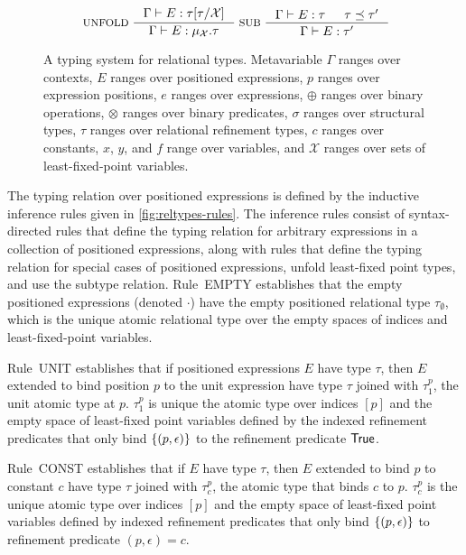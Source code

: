 \begin{figure}
\begin{gather*}
    \inference[ UNFOLD ]{
      \Gamma \judges E : %
      \replace{ \tau }{ \mathcal{X} }{ \tau } }{ 
      \Gamma \judges E : \mu_{\mathcal{X}}. \tau } 
    \inference[ SUB ]{
      \Gamma \judges E : \tau &
      \tau \subtype \tau' }{ %
      \Gamma \judges E : \tau' }
  \end{gather*}
  \caption{A typing system for relational types.
    Metavariable %
    $\Gamma$ ranges over contexts, %
    $E$ ranges over positioned expressions, %
    $p$ ranges over expression positions, %
    $e$ ranges over expressions, %
    $\oplus$ ranges over binary operations, %
    $\otimes$ ranges over binary predicates, %
    $\sigma$ ranges over structural types, %
    $\tau$ ranges over relational refinement types, %
    $c$ ranges over constants, %
    $x$, $y$, and $f$ range over variables, and %
    $\mathcal{X}$ ranges over sets of least-fixed-point variables. }
  \label{fig:reltypes-rules}
\end{figure}

The typing relation over positioned expressions is defined by the
inductive inference rules given in \autoref{fig:reltypes-rules}.
%
The inference rules consist of syntax-directed rules that define the
typing relation for arbitrary expressions in a collection of
positioned expressions, along with rules that define the typing
relation for special cases of positioned expressions, unfold
least-fixed point types, and use the subtype relation.
Rule~EMPTY establishes that the empty positioned expressions (denoted
$\cdot$) have the empty positioned relational type $\tau_{\emptyset}$,
which is the unique atomic relational type over the empty spaces of
indices and least-fixed-point variables.

Rule~UNIT establishes that if positioned expressions $E$ have type
$\tau$, then $E$ extended to bind position $p$ to the unit expression
have type $\tau$ joined with $\tau_1^p$, the unit atomic type at $p$.
%
$\tau_1^p$ is unique the atomic type over indices $[ p ]$ and the
empty space of least-fixed point variables defined by the indexed
refinement predicates that only bind $\{  (p, \epsilon)  \}$ to the
refinement predicate $\mathsf{True}$.

Rule~CONST establishes that if $E$ have type $\tau$, then $E$ extended
to bind $p$ to constant $c$ have type $\tau$ joined with $\tau_c^p$,
the atomic type that binds $c$ to $p$.
%
$\tau_c^p$ is the unique atomic type over indices $[ p ]$ and the
empty space of least-fixed point variables defined by indexed
refinement predicates that only bind $\{  (p, \epsilon)  \}$ to
refinement predicate $(p, \epsilon) = c$.

